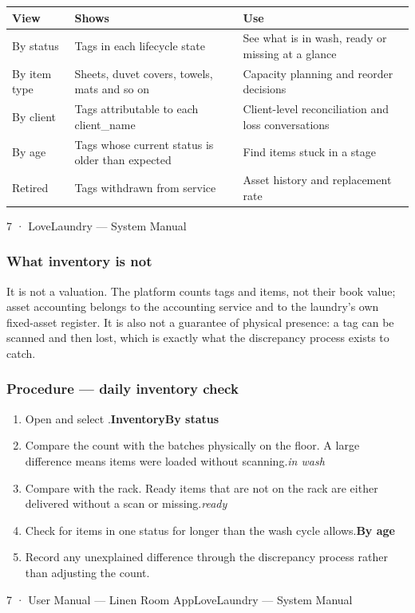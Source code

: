 \documentclass[11pt,a4paper,oneside]{book}
\begin{document}
\begin{center}\small
\begin{tabularx}{\linewidth}{|X|X|X|}
\hline
\rowcolor{lightgrey}
\textbf{View} & \textbf{Shows} & \textbf{Use} \\ \hline
By status & Tags in each lifecycle state & See what is in wash, ready or missing at a glance \\ \hline
By item type & Sheets, duvet covers, towels, mats and so on & Capacity planning and reorder decisions \\ \hline
By client & Tags attributable to each client\_name & Client-level reconciliation and loss conversations \\ \hline
By age & Tags whose current status is older than expected & Find items stuck in a stage \\ \hline
Retired & Tags withdrawn from service & Asset history and replacement rate \\ \hline
\end{tabularx}
\end{center}
7 · LoveLaundry — System Manual

\subsubsection*{What inventory is not}
It is not a valuation. The platform counts tags and items, not their book value; asset accounting belongs to the accounting service and to the laundry's own fixed-asset register. It is also not a guarantee of physical presence: a tag can be scanned and then lost, which is exactly what the discrepancy process exists to catch.

\subsubsection*{Procedure — daily inventory check}
\begin{enumerate}
\item Open  and select .\textbf{Inventory}\textbf{By status}
\item Compare the  count with the batches physically on the floor. A large difference means items were loaded without scanning.\emph{in wash}
\item Compare  with the rack. Ready items that are not on the rack are either delivered without a scan or missing.\emph{ready}
\item Check  for items in one status for longer than the wash cycle allows.\textbf{By age}
\item Record any unexplained difference through the discrepancy process rather than adjusting the count.
\end{enumerate}
7 · User Manual — Linen Room AppLoveLaundry — System Manual
\end{document}
